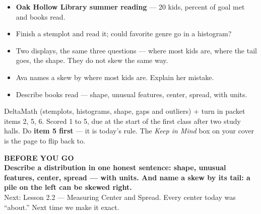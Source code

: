 \documentclass[aspectratio=169, 11pt]{beamer}
\begin{document}
\begin{frame}[t, plain]
  \begin{itemize}\setlength{\itemsep}{5pt}
    \item \textbf{Oak Hollow Library summer reading} --- 20 kids, percent of goal met and books read.
    \item Finish a stemplot and read it; could favorite genre go in a histogram?
    \item Two displays, the same three questions --- where most kids are, where the tail goes,
          the shape. They do not skew the same way.
    \item Ava names a skew by where most kids are. Explain her mistake.
    \item Describe books read --- shape, unusual features, center, spread, with units.
  \end{itemize}
  \begin{block}{DeltaMath (stemplots, histograms, shape, gaps and outliers) + turn in packet items 2, 5, 6. Scored 1 to 5, due at the start of the first class after two study halls.}
    Do \textbf{item 5 first} --- it is today's rule. The \emph{Keep in Mind} box on your cover is
    the page to flip back to.
  \end{block}
\end{frame}

{
\begin{frame}[plain]
  \vspace{1.5cm}\hspace{0.8cm}%
  \begin{minipage}{0.86\textwidth}
    {\color{goldacc}\bfseries\small BEFORE YOU GO}\\[0.7cm]
    {\color{white}\bfseries\Large Describe a distribution in one honest sentence: shape,
    unusual features, center, spread --- with units. And name a skew by its tail: a pile on the
    left can be skewed right.}\\[0.9cm]
    {\color{frostmid}\small Next: Lesson 2.2 --- Measuring Center and Spread. Every center today
    was ``about.'' Next time we make it exact.}
  \end{minipage}
\end{frame}
}
\end{document}
